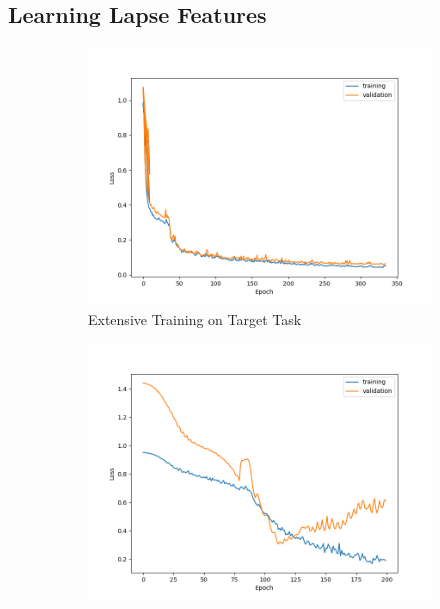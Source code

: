\subsection{Learning Lapse Features}

\begin{figure}[ht!]
    \centering
    \begin{subfigure}{0.48\textwidth}
        \includegraphics[width=\textwidth]{./project3/figures/figure1a.png}
        \caption{Extensive Training on Target Task} 
        \label{subfig3-1:extensive}
    \end{subfigure}\hfill
    \begin{subfigure}{0.48\textwidth}
        \includegraphics[width=\textwidth]{./project3/figures/figure1b.png}

\end{subfigure}
\end{figure}
